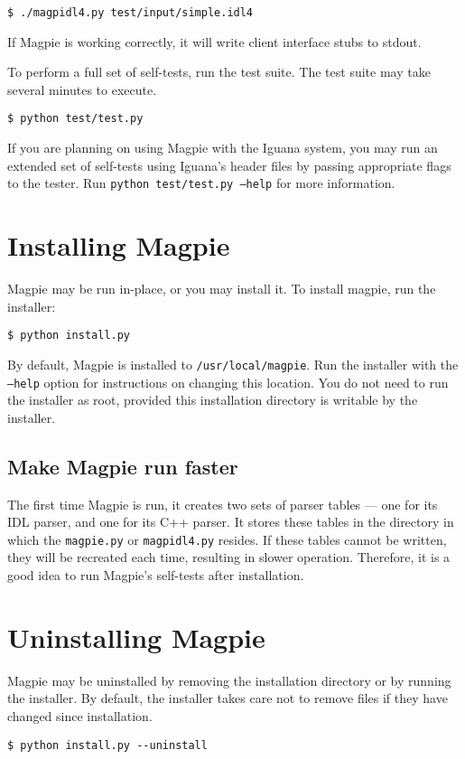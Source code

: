\begin{verbatim}
$ ./magpidl4.py test/input/simple.idl4
\end{verbatim}

If Magpie is working correctly, it will write client interface stubs to stdout.

To perform a full set of self-tests, run the test suite. The test suite may take several minutes to execute.

\begin{verbatim}
$ python test/test.py
\end{verbatim}

If you are planning on using Magpie with the Iguana system, you may run an extended set of self-tests using Iguana's header files by passing appropriate flags to the tester. Run {\tt python test/test.py --help} for more information.

\section{Installing Magpie}
Magpie may be run in-place, or you may install it. To install magpie, run the installer:

\begin{verbatim}
$ python install.py
\end{verbatim}

By default, Magpie is installed to {\tt /usr/local/magpie}. Run the installer with the {\tt --help} option for instructions on changing this location. You do not need to run the installer as root, provided this installation directory is writable by the installer.

\subsection{Make Magpie run faster}
The first time Magpie is run, it creates two sets of parser tables --- one for its IDL parser, and one for its C++ parser. It stores these tables in the directory in which the {\tt magpie.py} or {\tt magpidl4.py} resides. If these tables cannot be written, they will be recreated each time, resulting in slower operation. Therefore, it is a good idea to run Magpie's self-tests after installation.

\section{Uninstalling Magpie}
Magpie may be uninstalled by removing the installation directory or by running the installer. By default, the installer takes care not to remove files if they have changed since installation.

\begin{verbatim}
$ python install.py --uninstall
\end{verbatim}
